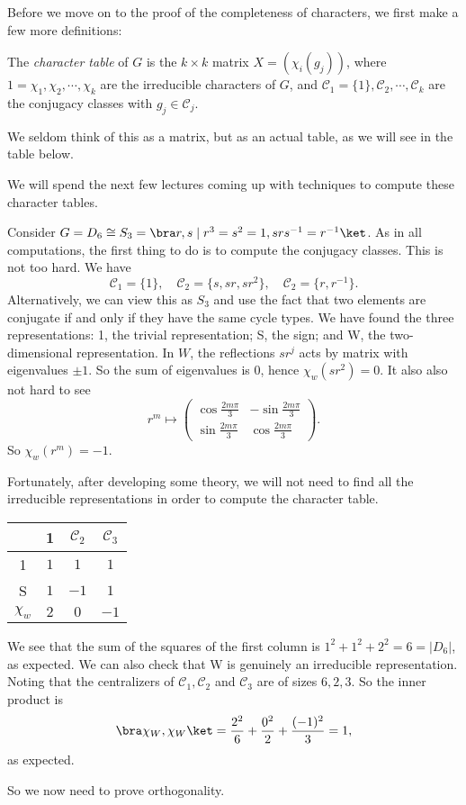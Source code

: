 \documentclass[a4paper]{article}
\begin{document}
Before we move on to the proof of the completeness of characters, we first make a few more definitions:
\begin{defi}
  The \emph{character table} of $G$ is the $k \times k$ matrix $X = (\chi_i (g_j))$, where $1 = \chi_1, \chi_2, \cdots, \chi_k$ are the irreducible characters of $G$, and $\mathcal{C}_1 = \{1\}, \mathcal{C}_2, \cdots, \mathcal{C}_k$ are the conjugacy classes with $g_j \in \mathcal{C}_j$.
\end{defi}
We seldom think of this as a matrix, but as an actual table, as we will see in the table below.

We will spend the next few lectures coming up with techniques to compute these character tables.

\begin{eg}
  Consider $G = D_6 \cong S_3 = \bra r, s\mid r^3 = s^2 = 1, srs^{-1} = r^{-1}\ket$. As in all computations, the first thing to do is to compute the conjugacy classes. This is not too hard. We have
  \[
    \mathcal{C}_1 = \{1\},\quad \mathcal{C}_2 = \{s, sr, sr^2\},\quad \mathcal{C}_2 = \{r, r^{-1}\}.
  \]
  Alternatively, we can view this as $S_3$ and use the fact that two elements are conjugate if and only if they have the same cycle types. We have found the three representations: 1, the trivial representation; S, the sign; and W, the two-dimensional representation. In $W$, the reflections $sr^j$ acts by matrix with eigenvalues $\pm 1$. So the sum of eigenvalues is $0$, hence $\chi_w(sr^2)= 0$. It also also not hard to see
  \[
    r^m \mapsto
    \begin{pmatrix}
      \cos \frac{2m \pi}{3} & - \sin \frac{2m\pi}{3}\\
      \sin \frac{2m\pi}{3} & \cos \frac{2m \pi}{3}
    \end{pmatrix}.
  \]
  So $\chi_w(r^m) = -1$.

  Fortunately, after developing some theory, we will not need to find all the irreducible representations in order to compute the character table.
  \begin{center}
    \begin{tabular}{cccc}
      \toprule
      & 1 & $\mathcal{C}_2$ & $\mathcal{C}_3$\\
      \midrule
      1 & $1$ & $1$ & $1$\\
      S & $1$ & $-1$ & $1$\\
      $\chi_w$ & $2$ & $0$ & $-1$\\
      \bottomrule
    \end{tabular}
  \end{center}
  We see that the sum of the squares of the first column is $1^2 + 1^2 + 2^2 = 6 = |D_6|$, as expected. We can also check that W is genuinely an irreducible representation. Noting that the centralizers of $\mathcal{C}_1, \mathcal{C}_2$ and $\mathcal{C}_3$ are of sizes $6, 2, 3$. So the inner product is
  \[
    \bra \chi_W, \chi_W\ket = \frac{2^2}{6} + \frac{0^2}{2} + \frac{(-1)^2}{3} = 1,
  \]
  as expected.
\end{eg}
So we now need to prove orthogonality.
\end{document}
